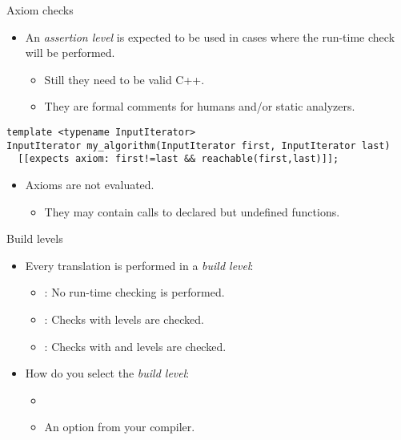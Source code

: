 \begin{frame}[t,fragile]{Axiom checks}
\begin{itemize}
  \item An  \emph{assertion level} is expected to be used in cases
where the run-time check will  be performed.
    \begin{itemize}
      \item Still they need to be valid C++.
      \item They are formal comments for humans and/or static analyzers.
    \end{itemize}
\end{itemize}

\vfill\pause
\begin{lstlisting}
template <typename InputIterator>
InputIterator my_algorithm(InputIterator first, InputIterator last)
  [[expects axiom: first!=last && reachable(first,last)]];
\end{lstlisting}

\vfill\pause
\begin{itemize}
  \item Axioms are not evaluated.
    \begin{itemize}
      \item They may contain calls to declared but undefined functions.
    \end{itemize}
\end{itemize}
\end{frame}

\begin{frame}[t]{Build levels}
\begin{itemize}
  \item Every translation is performed in a \emph{build level}:
    \begin{itemize}
      \item {}: No run-time checking is performed.
      \item {}: Checks with  levels are checked.
      \item {}: Checks with  and 
levels are checked.
    \end{itemize}
  
  \vfill\pause
  \item How do you select the \emph{build level}:
    \begin{itemize}
      \item {}
      \item An option from your compiler.
    \end{itemize}
\end{itemize}
\end{frame}

